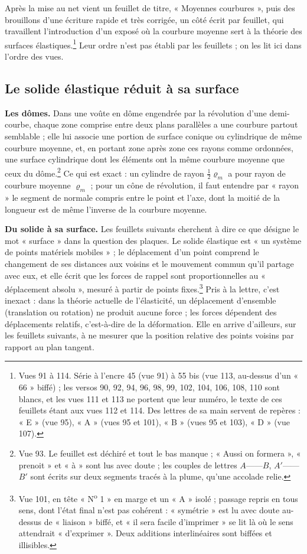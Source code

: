 \documentclass[11pt,a4paper]{article}
\begin{document}
Après la mise au net vient un feuillet de titre, « Moyennes courbures », puis
des brouillons d'une écriture rapide et très corrigée, un côté écrit par feuillet,
qui travaillent l'introduction d'un exposé où la courbure moyenne sert à la
théorie des surfaces élastiques.\footnote{Vues 91 à 114. Série à l'encre 45
(vue 91) à 55 bis (vue 113, au-dessus d'un « 66 » biffé) ; les versos 90, 92, 94,
96, 98, 99, 102, 104, 106, 108, 110 sont blancs, et les vues 111 et 113 ne
portent que leur numéro, le texte de ces feuillets étant aux vues 112 et 114. Des
lettres de sa main servent de repères : « E » (vue 95), « A » (vues 95 et 101),
« B » (vues 95 et 103), « D » (vue 107).} Leur ordre n'est pas établi par les
feuillets ; on les lit ici dans l'ordre des vues.

\subsection*{Le solide élastique réduit à sa surface}

\textbf{Les dômes.} Dans une voûte en dôme engendrée par la révolution d'une
demi-courbe, chaque zone comprise entre deux plans parallèles a une courbure
partout semblable ; elle lui associe une portion de surface conique ou
cylindrique de même courbure moyenne, et, en portant zone après zone ces rayons
comme ordonnées, une surface cylindrique dont les éléments ont la même courbure
moyenne que ceux du dôme.\footnote{Vue 93. Le feuillet est déchiré et tout le bas
manque ; « Aussi on formera », « prenoit » et « à » sont lus avec doute ; les
couples de lettres $A$——$B$, $A'$——$B'$ sont écrits sur deux segments tracés à la
plume, qu'une accolade relie.} Ce qui est exact : un cylindre de rayon
$\frac12\varrho_m$ a pour rayon de courbure moyenne $\varrho_m$ ; pour un cône
de révolution, il faut entendre par « rayon » le segment de normale compris entre
le point et l'axe, dont la moitié de la longueur est de même l'inverse de la
courbure moyenne.

\textbf{Du solide à sa surface.} Les feuillets suivants cherchent à dire ce que
désigne le mot « surface » dans la question des plaques. Le solide élastique est
« un système de points matériels mobiles » ; le déplacement d'un point comprend
le changement de ses distances aux voisins et le mouvement commun qu'il partage
avec eux, et elle écrit que les forces de rappel sont proportionnelles au
« déplacement absolu », mesuré à partir de points fixes.\footnote{Vue 101, en
tête « N\textsuperscript{o} 1 » en marge et un « A » isolé ; passage repris en tous sens, dont
l'état final n'est pas cohérent : « symétrie » est lu avec doute au-dessus de
« liaison » biffé, et « il sera facile d'imprimer » se lit là où le sens
attendrait « d'exprimer ». Deux additions interlinéaires sont biffées et
illisibles.} Pris à la lettre, c'est inexact : dans la théorie actuelle de
l'élasticité, un déplacement d'ensemble (translation ou rotation) ne produit
aucune force ; les forces dépendent des déplacements relatifs, c'est-à-dire de
la déformation. Elle en arrive d'ailleurs, sur les feuillets suivants, à ne
mesurer que la position relative des points voisins par rapport au plan
tangent.
\end{document}
